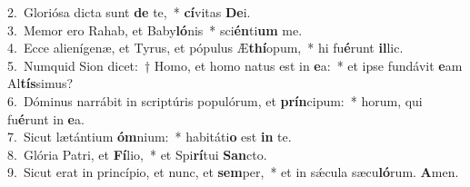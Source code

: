 {2.~}Gloriósa dicta sunt \textbf{de} te,~* \textbf{cí}vitas \textbf{De}i.\\
{3.~}Memor ero Rahab, et Baby\textbf{ló}nis~* sci\textbf{én}ti\textbf{um} me.\\
{4.~}Ecce alienígenæ, et Tyrus, et pópulus Æ\textbf{thí}opum,~* hi fu\textbf{é}runt \textbf{il}lic.\\
{5.~}Numquid Sion dicet:~† Homo, et homo natus est in \textbf{e}a:~* et ipse fundávit \textbf{e}am Al\textbf{tís}simus?\\
{6.~}Dóminus narrábit in scriptúris populórum, et \textbf{prín}cipum:~* horum, qui fu\textbf{é}runt in \textbf{e}a.\\
{7.~}Sicut lætántium \textbf{óm}nium:~* habitáti\textbf{o} est \textbf{in} te.\\
{8.~}Glória Patri, et \textbf{Fí}lio,~* et Spi\textbf{rí}tui \textbf{San}cto.\\
{9.~}Sicut erat in princípio, et nunc, et \textbf{sem}per,~* et in sǽcula sæcu\textbf{ló}rum. \textbf{A}men.\\
